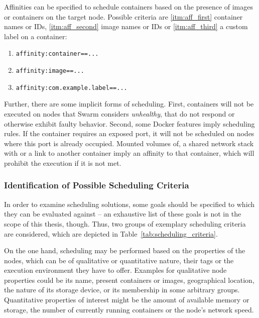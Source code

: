     Affinities can be specified to schedule containers based on the presence of images or containers on the target node. Possible criteria are \ref{itm:aff_first} container names or \acp{ID}, \ref{itm:aff_second} image names or \acp{ID} or \ref{itm:aff_third} a custom label on a container:

    \begin{enumerate}[label=\alph*), nosep]
      \item \label{itm:aff_first} \texttt{affinity:container==...}
      \item \label{itm:aff_second} \texttt{affinity:image==...}
      \item \label{itm:aff_third} \texttt{affinity:com.example.label==...}
    \end{enumerate}

    Further, there are some implicit forms of scheduling. First, containers will not be executed on nodes that Swarm considers \emph{unhealthy}, \ie that do not respond or otherwise exhibit faulty behavior. Second, some Docker features imply scheduling rules. If the container requires an exposed port, it will not be scheduled on nodes where this port is already occupied. Mounted volumes of, a shared network stack with or a link to another container imply an affinity to that container, which will prohibit the execution if it is not met.

  \subsubsection{Identification of Possible Scheduling Criteria} %
  \label{ssub:identification_of_desired_scheduling_criteria}
    In order to examine scheduling solutions, some goals should be specified to which they can be evaluated against -- an exhaustive list of these goals is not in the scope of this thesis, though. Thus, two groups of exemplary scheduling criteria are considered, which are depicted in Table~\ref{tab:scheduling_criteria}.

    On the one hand, scheduling may be performed based on the properties of the nodes, which can be of qualitative or quantitative nature, their tags or the execution environment they have to offer. Examples for qualitative node properties could be its name, present containers or images, geographical location, the nature of its storage device, or its membership in some arbitrary groups. Quantitative properties of interest might be the amount of available memory or storage, the number of currently running containers or the node's network speed.

